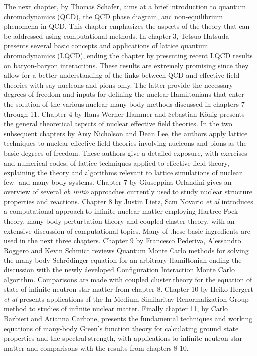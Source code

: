 The next chapter, by Thomas Sch\"afer, aims at a brief introduction to
quantum chromodynamics (QCD), the QCD phase diagram, and
non-equilibrium phenomena in QCD. This chapter emphasizes the aspects
of the theory that can be addressed using computational methods. In
chapter 3, Tetsuo Hatsuda presents several basic concepts and
applications of lattice quantum chromodynamics (LQCD), ending the
chapter by presenting recent LQCD results on baryon-baryon
interactions.  These results are extremely promising since they allow
for a better understanding of the links between QCD and effective
field theories with say nucleons and pions only. The latter provide
the necessary degrees of freedom and inputs for defining the nuclear
Hamiltonians that enter the solution of the various nuclear many-body
methods discussed in chapters 7 through 11. Chapter 4 by Hans-Werner
Hammer and Sebastian K\"onig presents the general theoretical aspects
of nuclear effective field theories. In the two subsequent chapters by
Amy Nicholson and Dean Lee, the authors apply lattice techniques to
nuclear effective field theories involving nucleons and pions as the
basic degrees of freedom. These authors give a detailed exposure, with
exercises and numerical codes, of lattice techniques applied to
effective field theory, explaining the theory and algorithms relevant
to lattice simulations of nuclear few- and many-body systems.  Chapter
7 by Giuseppina Orlandini gives an overview of several {\it ab initio}
approaches currently used to study nuclear structure properties and
reactions. Chapter 8 by Justin Lietz, Sam Novario {\em et al}
introduces a computational approach to infinite nuclear matter
employing Hartree-Fock theory, many-body perturbation theory and
coupled cluster theory, with an extensive discussion of computational
topics. Many of these basic ingredients are used in the next three
chapters. Chapter 9 by Francesco Pederiva, Alessandro Roggero and
Kevin Schmidt reviews Quantum Monte Carlo methods for solving the
many-body Schr\"odinger equation for an arbitrary Hamiltonian ending
the discussion with the newly developed Configuration Interaction
Monte Carlo algorithm. Comparisons are made  with coupled cluster theory for
the equation of state of infinite neutron star matter from chapter 8. Chapter 10 by
Heiko Hergert {\em et al} presents applications of the In-Medium
Similaritay Renormalization Group method to studies of infinite nuclear
matter. Finally chapter 11, by Carlo Barbieri and Arianna Carbone,
presents the fundamental techniques and working equations of many-body
Green's function theory for calculating ground state properties and
the spectral strength, with applications to infinite neutron star
matter and comparisons with the results from chapters 8-10.


